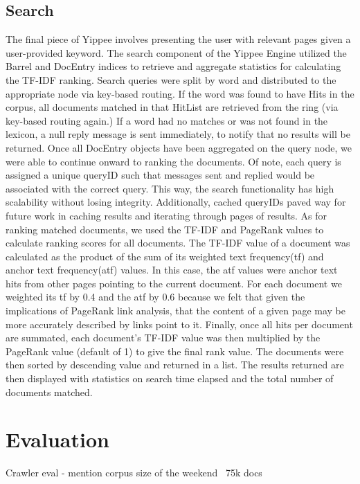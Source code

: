 \documentclass[11pt, letterpaper, oneside, twocolumn]{article}
\begin{document}
\subsection{Search}
The final piece of Yippee involves presenting the user with relevant pages given a user-provided keyword.
The search component of the Yippee Engine utilized the Barrel and DocEntry indices to retrieve and aggregate statistics for calculating the TF-IDF ranking. 
Search queries were split by word and distributed to the appropriate node via key-based routing. 
If the word was found to have Hits in the corpus, all documents matched in that HitList are retrieved from the ring (via key-based routing again.) 
If a word had no matches or was not found in the lexicon, a null reply message is sent immediately, to notify that no results will be returned. 
Once all DocEntry objects have been aggregated on the query node, we were able to continue onward to ranking the documents. 
Of note, each query is assigned a unique queryID such that messages sent and replied would be associated with the correct query. 
This way, the search functionality has high scalability without losing integrity. 
Additionally, cached queryIDs paved way for future work in caching results and iterating through pages of results.
As for ranking matched documents, we used the TF-IDF and PageRank values to calculate ranking scores for all documents. 
The TF-IDF value of a document was calculated as the product of the sum of its weighted text frequency(tf) and anchor text frequency(atf) values. 
In this case, the atf values were anchor text hits from other pages pointing to the current document. For each document we weighted its tf by 0.4 and the atf by 0.6 because we felt that given the implications of PageRank link analysis, that the content of a given page may be more accurately described by links point to it. 
Finally, once all hits per document are summated, each document's TF-IDF value was then multiplied by the PageRank value (default of 1) to give the final rank value. 
The documents were then sorted by descending value and returned in a list.
The results returned are then displayed with statistics on search time elapsed and the total number of documents matched.

\section{Evaluation}
\label{sec:evaluation}

Crawler eval - mention corpus size of the weekend ~75k docs
\end{document}
